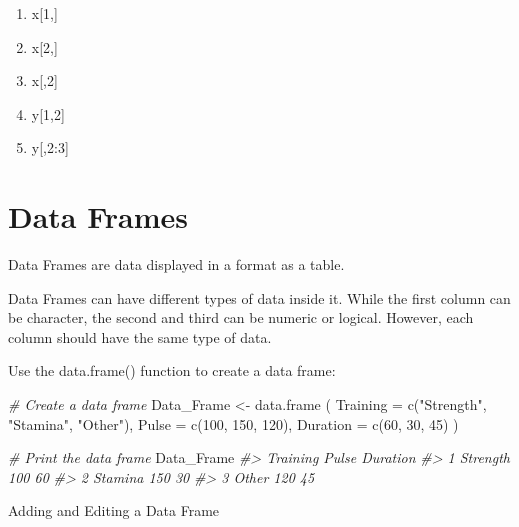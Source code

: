 \documentclass[
]{book}
\newenvironment{Shaded}{\begin{snugshade}}{\end{snugshade}}
\newcommand{\AttributeTok}[1]{\textcolor[rgb]{0.77,0.63,0.00}{#1}}
\newcommand{\CommentTok}[1]{\textcolor[rgb]{0.56,0.35,0.01}{\textit{#1}}}
\newcommand{\DecValTok}[1]{\textcolor[rgb]{0.00,0.00,0.81}{#1}}
\newcommand{\FunctionTok}[1]{\textcolor[rgb]{0.00,0.00,0.00}{#1}}
\newcommand{\NormalTok}[1]{#1}
\newcommand{\OtherTok}[1]{\textcolor[rgb]{0.56,0.35,0.01}{#1}}
\newcommand{\StringTok}[1]{\textcolor[rgb]{0.31,0.60,0.02}{#1}}
\providecommand{\tightlist}{%
  \setlength{\itemsep}{0pt}\setlength{\parskip}{0pt}}
\begin{document}
\begin{enumerate}
\def\labelenumi{(\alph{enumi})}
\tightlist
\item
  x{[}1,{]}
\item
  x{[}2,{]}
\item
  x{[},2{]}
\item
  y{[}1,2{]}
\item
  y{[},2:3{]}
\end{enumerate}

\hypertarget{data-frames}{%
\chapter{Data Frames}\label{data-frames}}

Data Frames are data displayed in a format as a table.

Data Frames can have different types of data inside it. While the first column can be character, the second and third can be numeric or logical. However, each column should have the same type of data.

Use the data.frame() function to create a data frame:

\begin{Shaded}
\begin{Highlighting}[]
\CommentTok{\# Create a data frame}
\NormalTok{Data\_Frame }\OtherTok{\textless{}{-}} \FunctionTok{data.frame}\NormalTok{ (}
  \AttributeTok{Training =} \FunctionTok{c}\NormalTok{(}\StringTok{"Strength"}\NormalTok{, }\StringTok{"Stamina"}\NormalTok{, }\StringTok{"Other"}\NormalTok{),}
  \AttributeTok{Pulse =} \FunctionTok{c}\NormalTok{(}\DecValTok{100}\NormalTok{, }\DecValTok{150}\NormalTok{, }\DecValTok{120}\NormalTok{),}
  \AttributeTok{Duration =} \FunctionTok{c}\NormalTok{(}\DecValTok{60}\NormalTok{, }\DecValTok{30}\NormalTok{, }\DecValTok{45}\NormalTok{)}
\NormalTok{)}

\CommentTok{\# Print the data frame}
\NormalTok{Data\_Frame}
\CommentTok{\#\textgreater{}   Training Pulse Duration}
\CommentTok{\#\textgreater{} 1 Strength   100       60}
\CommentTok{\#\textgreater{} 2  Stamina   150       30}
\CommentTok{\#\textgreater{} 3    Other   120       45}
\end{Highlighting}
\end{Shaded}

Adding and Editing a Data Frame
\end{document}

